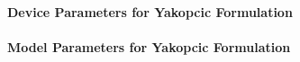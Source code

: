 


\paragraph{Device Parameters for Yakopcic Formulation}


\paragraph{Model Parameters for Yakopcic Formulation}





